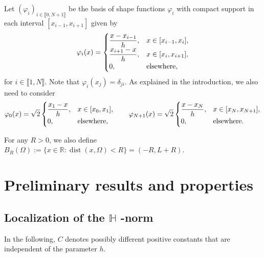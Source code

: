 \documentclass[11 pt]{article}
\newcommand\inter[1]{\llbracket #1\rrbracket}
\numberwithin{equation}{section}
\def\dist{\operatorname{dist}}
\def\R{\mathbb{R}}
\begin{document}
Let $(\varphi_i)_{i\in\inter{0,N+1}}$ be the basis of shape functions $\varphi_i$ with compact support in each interval $[x_{i-1},x_{i+1}]$ given by
%
\begin{align}\label{eq:def_basis}
 \varphi_i(x)=\begin{cases}
        \displaystyle \frac{x-x_{i-1}}{h}, &x\in[x_{i-1},x_i], \\
        \displaystyle \frac{x_{i+1}-x}{h}, &x\in [x_i,x_{i+1}], \\
        0, &\textnormal{elsewhere},
    \end{cases}
\end{align}
for $i\in\inter{1,N}$.  Note that $\varphi_i(x_j)=\delta_{ji}$.  As explained in the introduction, we also need to consider 
%
\begin{align}\label{eq:def_basis_ext}
    \varphi_0(x)=\sqrt{2}\begin{cases}
        \displaystyle \frac{x_{1}-x}{h}, &x\in [x_0,x_{1}], \\
        0, &\textnormal{elsewhere},
    \end{cases} \qquad \varphi_{N+1}(x)=\sqrt{2}\begin{cases}
        \displaystyle \frac{x-x_{N}}{h}, &x\in[x_{N},x_{N+1}], \\
        0, &\textnormal{elsewhere.}
    \end{cases}
\end{align}
%

For any $R>0$, we also define $B_{R}(\Omega):=\{x\in\R:\dist(x,\Omega)<R\}=(-R,L+R)$.


\section{Preliminary results and properties}\label{sec:three}

\subsection{Localization of the
\texorpdfstring{$\mathbb{H}$}{H}
-norm}\label{sec:localization-norm}

In the following, $C$ denotes possibly different positive constants that are independent of the parameter $h$. 
\end{document}
